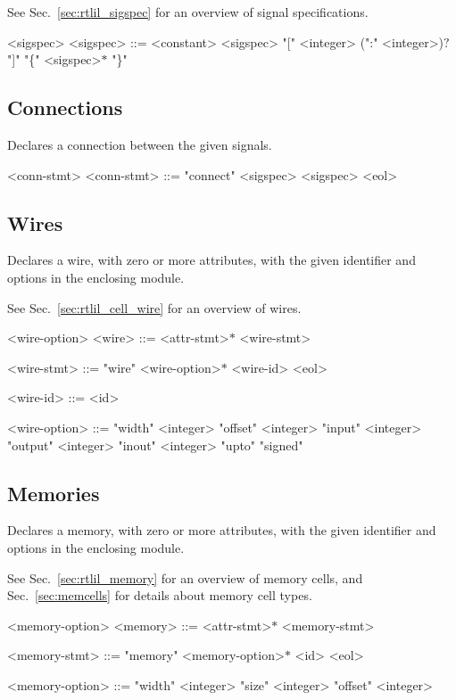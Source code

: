 See Sec.~\ref{sec:rtlil_sigspec} for an overview of signal specifications.

\begin{indentgrammar}{<sigspec>}
<sigspec> ::=
<constant>
    \alt <sigspec> "[" <integer> (":" <integer>)$?$ "]"
    \alt "\{" <sigspec>$*$ "\}"
\end{indentgrammar}

\subsection{Connections}

Declares a connection between the given signals.

\begin{indentgrammar}{<conn-stmt>}
<conn-stmt> ::= "connect" <sigspec> <sigspec> <eol>
\end{indentgrammar}

\subsection{Wires}

Declares a wire, with zero or more attributes, with the given identifier and options in the enclosing module.

See Sec.~\ref{sec:rtlil_cell_wire} for an overview of wires.

\begin{indentgrammar}{<wire-option>}
<wire> ::= <attr-stmt>$*$ <wire-stmt>

<wire-stmt> ::= "wire" <wire-option>$*$ <wire-id> <eol>

<wire-id> ::= <id>

<wire-option> ::= 
"width" <integer>
  \alt "offset" <integer>
  \alt "input" <integer>
  \alt "output" <integer>
  \alt "inout" <integer>
  \alt "upto"
  \alt "signed"
\end{indentgrammar}

\subsection{Memories}

Declares a memory, with zero or more attributes, with the given identifier and options in the enclosing module.

See Sec.~\ref{sec:rtlil_memory} for an overview of memory cells, and Sec.~\ref{sec:memcells} for details about memory cell types.

\begin{indentgrammar}{<memory-option>}
<memory> ::= <attr-stmt>$*$ <memory-stmt>

<memory-stmt> ::= "memory" <memory-option>$*$ <id> <eol>

<memory-option> ::= 
"width" <integer>
  \alt "size" <integer>
  \alt "offset" <integer>
\end{indentgrammar}


